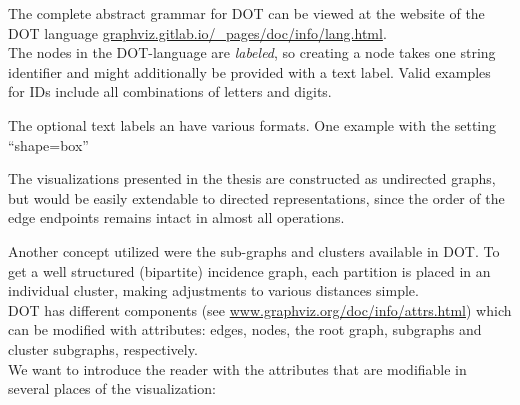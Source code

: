 \documentclass[a4paper, 12pt, bibliography=totoc]{scrartcl}
\begin{document}


The complete abstract grammar for DOT can be viewed at the website of the DOT language \url{graphviz.gitlab.io/_pages/doc/info/lang.html}.\\


The nodes in the DOT-language are \emph{labeled}, so creating a node takes one string identifier and might additionally be provided with a text label. Valid examples for IDs include all combinations of letters and digits.

The optional text labels an have various formats. One example with the setting ``shape=box''

The visualizations presented in the thesis are constructed as undirected graphs, but would be easily extendable to directed representations, since the order of the edge endpoints remains intact in almost all operations.

Another concept utilized were the sub-graphs and clusters available in DOT.
To get a well structured (bipartite) incidence graph, each partition is placed in an individual cluster, making adjustments to various distances simple.\\


DOT has different components (see \url{www.graphviz.org/doc/info/attrs.html}) which can be modified with attributes: edges, nodes, the root graph, subgraphs and cluster subgraphs, respectively.\\


We want to introduce the reader with the attributes that are modifiable in several places of the visualization:
\end{document}
